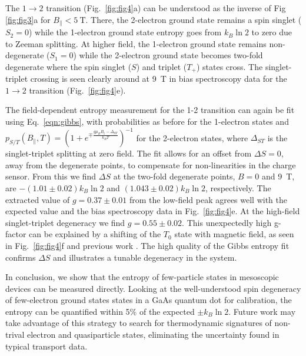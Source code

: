 \documentclass[twocolumn,showpacs,amsmath,amssymb,prl,aps,superscriptaddress]{revtex4-1}
\begin{document}
The $1\rightarrow 2$ transition (Fig.~\ref{fig:fig4}a) can be understood as the inverse of Fig \ref{fig:fig3}a for $B_\parallel < \SI{5}{\tesla}$.  There, the 2-electron ground state remains a spin singlet ($\mathit{S_2}=0$) while the 1-electron ground state entropy goes from $k_B\ln{2}$ to zero due to Zeeman splitting. At higher field, the 1-electron ground state remains non-degenerate ($\mathit{S_1}=0$) while the 2-electron ground state becomes two-fold degenerate where the spin singlet ($\mathit{S}$) and triplet ($\mathit{T_+}$) states cross. The singlet-triplet crossing is seen clearly around at \SI{9}{\tesla} in bias spectroscopy data for the $1\rightarrow 2$ transition (Fig.~\ref{fig:fig4}e). 

The field-dependent entropy measurement for the 1-2 transition can again be fit using Eq.~\ref{eqn:gibbs}, with probabilities as before for the 1-electron states and $p_{S/T}(B_\parallel, T) = (1+ e^{\mp \frac{g\mu_B B_\parallel - \Delta_{ST}}{k_B T}})^{-1}$ for the 2-electron states, where $\Delta_{ST}$ is the singlet-triplet splitting at zero field. The fit allows for an offset from $\Delta S=0$, away from the degenerate points, to compensate for non-linearities in the charge sensor. From this we find $\Delta S$ at the two-fold degenerate points, $B=0$ and \SI{9}{\tesla}, are $-(1.01\pm0.02) k_B \ln{2}$ and $(1.043 \pm 0.02) k_B \ln{2}$, respectively. The extracted value of $g = 0.37 \pm 0.01$ from the low-field peak agrees well with the expected value and the bias spectroscopy data in Fig.~\ref{fig:fig4}e. At the high-field singlet-triplet degeneracy we find $g = 0.55 \pm 0.02$. This unexpectedly high g-factor can be explained by a shifting of the $\mathit{T_0}$ state with magnetic field, as seen in Fig.~\ref{fig:fig4}f and previous work \cite{Szafran2004}. The high quality of the Gibbs entropy fit confirms $\Delta S$ and illustrates a tunable degeneracy in the system.

In conclusion, we show that the entropy of few-particle states in mesoscopic devices can be measured directly.  Looking at the well-understood spin degeneracy of  few-electron ground states states in a GaAs quantum dot for calibration, the entropy can be quantified within 5\% of the expected $\pm k_B\ln{2}$.  Future work may take advantage of this strategy to search for thermodynamic signatures of non-trival electron and quasiparticle states, eliminating the uncertainty found in typical transport data.
\end{document}
